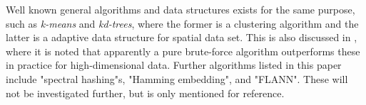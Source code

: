 Well known general algorithms and data structures exists for the same purpose, such as \textit{k-means} and \textit{kd-trees}, where the former is a clustering algorithm and the latter is a adaptive data structure for spatial data set. This is also discussed in \cite{schmid9}, where it is noted that apparently a pure brute-force algorithm outperforms these in practice for high-dimensional data. Further algorithms listed in this paper include "spectral hashing"s\cite{weiss8}, "Hamming embedding"\cite{jegou8}, and "FLANN"\cite{muja9}. These will not be investigated further, but is only mentioned for reference.

